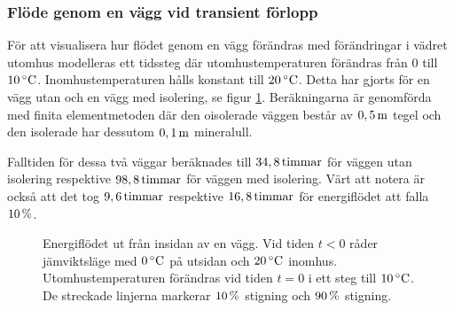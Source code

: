 \subsubsection{Flöde genom en vägg vid transient förlopp}


För att visualisera hur flödet genom en vägg förändras med
förändringar i vädret utomhus modelleras ett tidssteg där utomhustemperaturen förändras från 0 till $\unit[10]{^\circ C}$. Inomhustemperaturen hålls konstant till $\unit[20]{^\circ C}$. Detta har gjorts för en vägg utan och en vägg med isolering, se figur \ref{fig:energyflow_trans}. Beräkningarna är genomförda med finita elementmetoden där den oisolerade väggen består av $\unit[0,5]{m}$ tegel och den isolerade har dessutom $\unit[0,1]{m}$ mineralull.

Falltiden för dessa två väggar beräknades till $\unit[34,8]{timmar}$ för väggen utan isolering respektive $\unit[98,8]{timmar}$ för väggen med isolering. 
Värt att notera är också att det tog $\unit[9,6]{timmar}$ respektive $\unit[16,8]{timmar}$ för energiflödet att falla $\unit[10]{\%}$. 

\begin{figure}[hpbt]
\centering

\vspace{5mm}
\caption{\label{fig:energyflow_trans} Energiflödet ut från insidan av en vägg. Vid tiden $t<0$ råder jämviktsläge med $\unit[0]{^\circ C}$ på utsidan och $\unit[20]{^\circ C}$ inomhus. Utomhustemperaturen förändras vid tiden $t=0$ i ett steg till $\unit[10]{^\circ C}$. De streckade linjerna markerar $\unit[10]{\%}$ stigning och $\unit[90]{\%}$ stigning.}

\end{figure}

